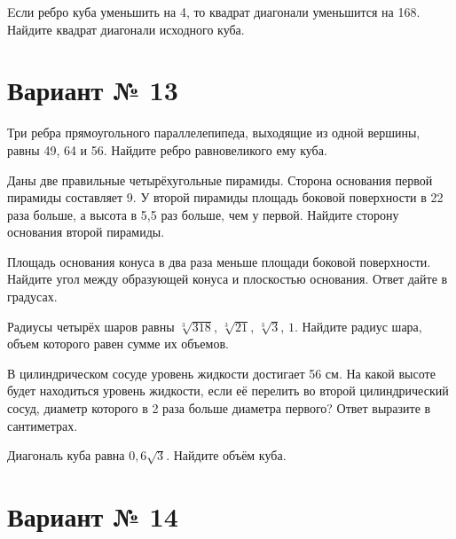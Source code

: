 \documentclass[4apaper]{article}
\begin{document}
\begin{taskBN}{6}
Eсли ребро куба уменьшить на 4, то квадрат диагонали уменьшится на 168. Найдите квадрат диагонали исходного куба.
\end{taskBN}
\newpage\section*{Вариант № 13}

\begin{taskBN}{1}
Три ребра прямоугольного параллелепипеда, выходящие из одной вершины, равны 49, 64 и 56. Найдите ребро равновеликого ему куба.
\end{taskBN}

\begin{taskBN}{2}
Даны две правильные четырёхугольные пирамиды. Сторона основания первой пирамиды составляет 9. У второй пирамиды площадь боковой поверхности в 22 раза больше, а высота в 5,5 раз больше, чем у первой. Найдите сторону основания второй пирамиды.
\end{taskBN}

\begin{taskBN}{3}
Площадь основания конуса в два раза меньше площади боковой поверхности. Найдите угол между образующей конуса и плоскостью основания. Ответ дайте в градусах.
\end{taskBN}

\begin{taskBN}{4}
Радиусы четырёх шаров равны $\sqrt[3]{318}$, $\sqrt[3]{21}$, $\sqrt[3]{3}$, $1$. Найдите радиус шара, объем которого равен сумме их объемов.
\end{taskBN}

\begin{taskBN}{5}
В цилиндрическом сосуде уровень жидкости достигает 56 см. На какой высоте будет находиться уровень жидкости, если её перелить во второй цилиндрический сосуд, диаметр которого в 2 раза больше диаметра первого? Ответ выразите в сантиметрах.
\end{taskBN}

\begin{taskBN}{6}
Диагональ куба равна $0,6\sqrt{3}$. Найдите объём куба.
\end{taskBN}
\newpage\section*{Вариант № 14}
\end{document}
